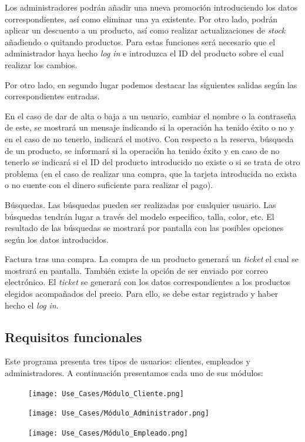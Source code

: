 Los administradores podrán añadir una nueva promoción introduciendo los datos correspondientes, así como eliminar una ya existente. Por otro lado, podrán aplicar un descuento a un producto, así como realizar actualizaciones de \textit{stock} añadiendo o quitando productos. Para estas funciones será necesario que el administrador haya hecho \textit{log in} e introduzca el ID del producto sobre el cual realizar los cambios.

Por otro lado, en segundo lugar podemos destacar las siguientes salidas según las correspondientes entradas.

En el caso de dar de alta o baja a un usuario, cambiar el nombre o la contraseña de este, se mostrará un mensaje indicando si la operación ha tenido éxito o no y en el caso de no tenerlo, indicará el motivo.
Con respecto a la reserva, búsqueda de un producto, se informará si la operación ha tenido éxito y en caso de no tenerlo se indicará si el ID del producto introducido no existe o si se trata de otro problema (en el caso de realizar una compra, que la tarjeta introducida no exista o no cuente con el dinero suficiente para realizar el pago).

Búsquedas. Las búsquedas pueden ser realizadas por cualquier usuario. Las búsquedas tendrán lugar a través del modelo especifico, talla, color, etc. El resultado de las búsquedas se mostrará por pantalla con las posibles opciones según los datos introducidos.

Factura tras una compra. La compra de un producto generará un \textit{ticket} el cual se mostrará en pantalla. También existe la opción de ser enviado por correo electrónico. El \textit{ticket} se generará con los datos correspondientes a los productos elegidos acompañados del precio. Para ello, se debe estar registrado y haber hecho el \textit{log in}.



\subsection{Requisitos funcionales}
Este programa presenta tres tipos de usuarios: clientes, empleados y administradores. A continuación presentamos cada uno de sus módulos:
\begin{figure}[H]
	\centering
	\texttt{[image: Use\_Cases/Módulo\_Cliente.png]}
\end{figure}

\begin{figure}[H]
	\centering
	\texttt{[image: Use\_Cases/Módulo\_Administrador.png]}
\end{figure}
\begin{figure}[H]
	\centering
	\texttt{[image: Use\_Cases/Módulo\_Empleado.png]}
\end{figure}

